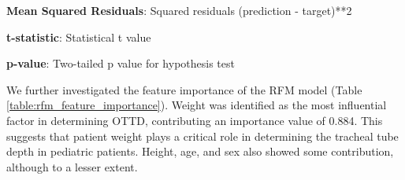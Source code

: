 \documentclass[11pt]{article}
\begin{document}
\begin{table}[h]
\caption{Performance comparison of Random Forest Model (RFM) and Height Formula-Based Model (HFMB)}
\label{table:rf_hfmb_comparison}
\begin{threeparttable}
\renewcommand{\TPTminimum}{\linewidth}
\begin{tablenotes}
\footnotesize
\item \textbf{Mean Squared Residuals}: Squared residuals (prediction - target)**2
\item \textbf{t-statistic}: Statistical t value
\item \textbf{p-value}: Two-tailed p value for hypothesis test
\end{tablenotes}
\end{threeparttable}
\end{table}


We further investigated the feature importance of the RFM model (Table \ref{table:rfm_feature_importance}). Weight was identified as the most influential factor in determining OTTD, contributing an importance value of 0.884. This suggests that patient weight plays a critical role in determining the tracheal tube depth in pediatric patients. Height, age, and sex also showed some contribution, although to a lesser extent.
\end{document}
